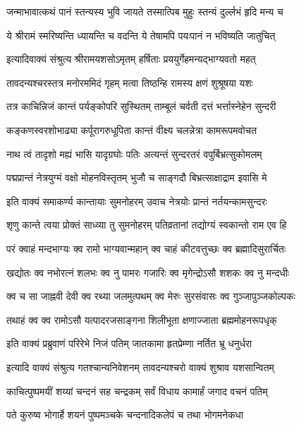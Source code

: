 \twolineshloka
{जन्माभावात्कथं पानं स्तन्यस्य भुवि जायते}
{तस्मात्पिब मुहुः स्तन्यं दुर्ल्लभं हृदि मन्य च}%

\twolineshloka
{ये श्रीरामं स्मरिष्यन्ति ध्यायन्ति च वदन्ति ये}
{तेषामपि पयःपानं न भविष्यति जातुचित्}%

\twolineshloka
{इत्यादिवाक्यं संश्रुत्य श्रीरामयशसोऽमृतम्}
{हर्षिताः प्रययुर्गेहमन्यद्भाग्यवतो महत्}%

\twolineshloka
{तावदन्यश्चरस्तत्र मनोरममिदं गृहम्}
{मत्वा तिष्ठन्हि रामस्य क्षणं शुश्रूषया यशः}%

\twolineshloka
{तत्र काचिन्निजं कान्तं पर्यङ्कोपरि सुस्थितम्}
{ताम्बूलं चर्वती दत्तं भर्त्तास्नेहेन सुन्दरी}%

\twolineshloka
{कङ्कणस्वरशोभाढ्या कर्पूरागरुधूपिता}
{कान्तं वीक्ष्य चलन्नेत्रा कामरूपमवोचत}%

\twolineshloka
{नाथ त्वं तादृशो मह्यं भासि यादृग्रघोः पतिः}
{अत्यन्तं सुन्दरतरं वपुर्बिभ्रत्सुकोमलम्}%

\twolineshloka
{पद्मप्रान्तं नेत्रयुग्मं वक्षो मोहनविस्तृतम्}
{भुजौ च साङ्गदौ बिभ्रत्साक्षाद्राम इवासि मे}%

\twolineshloka
{इति वाक्यं समाकर्ण्य कान्तायाः सुमनोहरम्}
{उवाच नेत्रयोः प्रान्तं नर्तयन्कामसुन्दरः}%

\twolineshloka
{शृणु कान्ते त्वया प्रोक्तं साध्व्या तु सुमनोहरम्}
{पतिव्रतानां तद्योग्यं स्वकान्तो राम एव हि}%

\twolineshloka
{परं क्वाहं मन्दभाग्यः क्व रामो भाग्यवान्महान्}
{क्व चाहं कीटवत्तुच्छः क्व ब्रह्मादिसुरार्चितः}%

\twolineshloka
{खद्योतः क्व नभोरत्नं शलभः क्व नु पामरः}
{गजारिः क्व मृगेन्द्रोऽसौ शशकः क्व नु मन्दधीः}%

\twolineshloka
{क्व च सा जाह्नवी देवी क्व रथ्या जलमुत्पथम्}
{क्व मेरुः सुरसंवासः क्व गुञ्जापुञ्जकोल्पकः}%

\twolineshloka
{तथाहं क्व क्व रामोऽसौ यत्पादरजसाङ्गना}
{शिलीभूता क्षणाज्जाता ब्रह्ममोहनरूपधृक्}%

\twolineshloka
{इति वाक्यं प्रब्रुवाणं परिरेभे निजं पतिम्}
{जातकामा हृतप्रेम्णा नर्तित भ्रू धनुर्धरा}%

\twolineshloka
{इत्यादि वाक्यं संश्रुत्य गतश्चान्यनिवेशनम्}
{तावदन्यश्चरो वाक्यं शुश्राव यशसान्वितम्}%

\twolineshloka
{काचित्पुष्पमयीं शय्यां चन्दनं सह चन्द्रकम्}
{सर्वं विधाय कामार्हं जगाद वचनं पतिम्}%

\twolineshloka
{पते कुरुष्व भोगार्हे शयनं पुष्पमञ्चके}
{चन्दनादिकलेपं च तथा भोगमनेकधा}%

